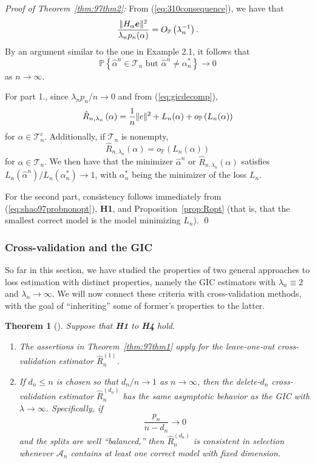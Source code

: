 \documentclass[11pt, letter paper]{article}
\newcommand{\1}{\mathmybb{1}}
\newtheorem{theorem}[proposition]{Theorem}
\newcommand{\0}{\emptyset}
\newcommand{\prob}{\mathbb{P}}
\newcommand{\paren}[1]{\left(#1 \right)}
\newcommand{\set}[1]{\left\{ #1 \right\}}
\newcommand{\norm}[1]{|\hspace{-1pt}|#1 |\hspace{-1pt}|}
\newcommand{\normsq}[1]{\norm{#1}^{2}}
\newcommand{\Acal}{\mathcal{A}_{n}}
\newcommand{\Tcal}{\mathcal{T}_{n}}
\newcommand{\e}{\boldsymbol{e}}
\newcommand{\Rhat}[2]{\hat{R}_{n, #1}\paren{#2}}
\newcommand{\alphahat}[1]{\hat{\alpha}^{#1}}
\newcommand{\op}[1]{o_{\prob}\paren{#1}}
\newcommand{\Op}[1]{O_{\prob}\paren{#1}}
\begin{document}
\begin{myproofbox}
    \textit{Proof of Theorem~\ref{thm:97thm2}: }From (\ref{eq:310consequence}), we have that 
    \begin{equation}\label{eq:shao97probnonopt}
        \frac{\normsq{H_{\alpha}\e}}{\lambda_{n}p_{n}(\alpha)} = \Op{\lambda_{n}^{-1}}.
    \end{equation}
    By an argument similar to the one in Example 2.1, it follows that
    \[\prob\set{\alphahat{n}\in\Tcal\text{ but }\alphahat{n}\neq\alpha^{*}_{n}}\to 0\]
    as \(n\to\infty\).

    For part 1., since \(\lambda_{n}p_{n}/n \to 0\) and from (\ref{eq:gicdecomp}),
    \[\Rhat{\lambda_{n}}{\alpha} = \frac{1}{n}\normsq{e} + L_{n}(\alpha) + \op{L_{n}(\alpha)}\]
    for \(\alpha\in\Tcal^{c}\). Additionally, if \(\Tcal\) is nonempty, 
    \[\Rhat{\lambda_{n}}{\alpha} = \op{L_{n}(\alpha)}\]
    for \(\alpha\in\Tcal\). We then have that the minimizer \(\alphahat{n}\) or \(\Rhat{\lambda_{n}}{\alpha}\) satisfies \(L_{n}(\alphahat{n})/L_{n}(\alpha^{*}_{n})\to 1\), with \(\alpha^{*}_{n}\) being the minimizer of the loss \(L_{n}\).

    For the second part, consistency follows immediately from (\ref{eq:shao97probnonopt}), \textbf{H1}, and Proposition~\ref{prop:Ropt} (that is, that the smallest correct model is the model minimizing \(L_n\)).
    \qed{}
\end{myproofbox}

\subsubsection{Cross-validation and the GIC}\label{sec:cvgic}

So far in this section, we have studied the properties of two general approaches to loss estimation with distinct properties, namely the GIC estimators with \(\lambda_{n}\equiv 2\) and \(\lambda_{n}\to\infty\). We will now connect these criteria with cross-validation methods, with the goal of ``inheriting'' some of former's properties to the latter.

\begin{theorem}[\cite{shao_1997}]\label{thm:97thm45}
    Suppose that \textbf{H1} to \textbf{H4} hold.

    \begin{enumerate}
        \item The assertions in Theorem~\ref{thm:97thm1} apply for the leave-one-out cross-validation estimator \(\hat{R}_{n}^{(1)}\).
        \item If \(d_{n}\leq n\) is chosen so that \(d_{n}/n\to1\) as \(n\to\infty\), then the delete-\(d_{n}\) cross-validation estimator \(\hat{R}_{n}^{(d_{n})}\) has the same asymptotic behavior as the GIC with \(\lambda\to\infty\). Specifically, if \[\frac{p_{n}}{n-d_{n}}\to 0\] and the splits are well ``balanced,'' then \(\hat{R}_{n}^{(d_{n})}\) is consistent in selection whenever \(\Acal\) contains at least one correct model with fixed dimension.
    \end{enumerate}
\end{theorem}
\end{document}
